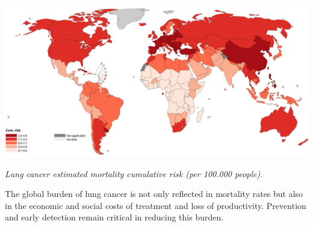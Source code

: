 \vspace{1em}
\begin{center}
    \includegraphics[width=1.00\textwidth]{../assets/01-overview/lc-cumulative-risk.png}

    \small\textit{Lung cancer estimated mortality cumulative risk (per 100.000 people). 
    \cite{who2024}}
\end{center}
\vspace{1em}

The global burden of lung cancer is not only reflected in mortality rates but also in the economic 
and social costs of treatment and loss of productivity. Prevention and early detection remain 
critical in reducing this burden.
